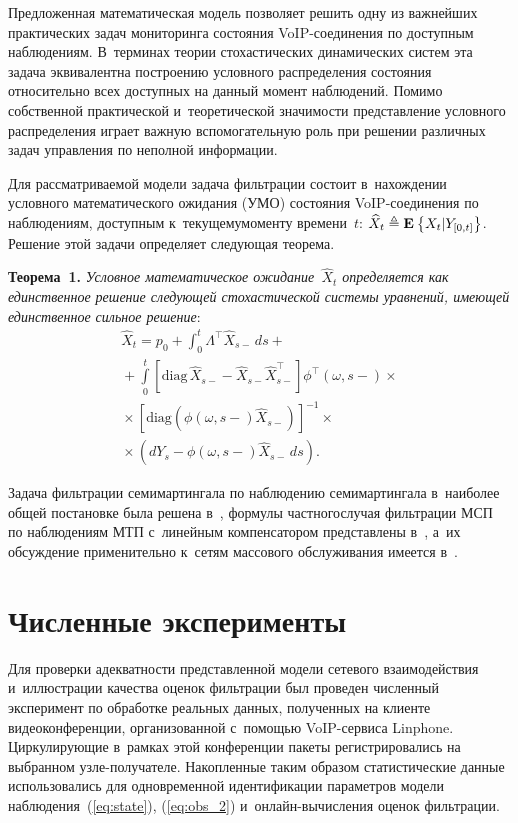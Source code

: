 \begin{multicols}{2}
Предложенная математическая модель позволяет решить одну из
важнейших практических задач мониторинга состояния VoIP-со\-еди\-не\-ния
по доступным наблюдениям. В~терминах теории стохастических
динамических систем эта задача эквивалентна построению условного
распределения состоя\-ния относительно всех доступных на данный момент
наблюдений. Помимо собственной практической и~теоретической
значимости представление условного распределения играет важную
вспомогательную роль при решении различных задач управления по
неполной информации.

Для рассматриваемой модели задача фильт\-рации состоит в~нахождении
условного ма\-те\-ма\-ти\-ческого ожидания (УМО) состояния VoIP-со\-еди\-нения
по наблюдениям, доступным к~текущему\linebreak моменту времени~$t$:
$\widehat{X}_t \triangleq \mathbf{E}_{  }\left\{ \mathop{X_t|Y_{[0,t]}} \right\}$. Решение этой задачи
определяет следующая теорема.

\smallskip

\noindent
\textbf{Теорема~1.}
\textit{Условное математическое ожидание~$\widehat{X}_t$ определяется как единственное решение следующей
стохастической системы уравнений, имеющей единственное сильное
решение}:
\begin{multline}
\widehat{X}_t = p_0 + \int_0^t \Lambda^{\top}\widehat{X}_{s-}\,ds +{}\\
{}+
\int\limits_0^t\left[ \mathrm{diag}\, \widehat{X}_{s-} - \widehat{X}_{s-}
\widehat{X}^{\top}_{s-}
 \right]\phi^{\top}(\omega,s-) \times{} \\ 
 {}\times
 \left[\mathrm{diag}\left(
 \phi(\omega,s-) \widehat{X}_{s-}
 \right) \right]^{-1}\times{}\\
 {}\times\left(
 dY_s-\phi(\omega,s-)\widehat{X}_{s-}\,ds
 \right).
\label{eq:filt_1}
\end{multline}


Задача фильтрации семимартингала по наблюдению семимартингала 
в~наиболее общей постановке была решена в~\cite{LS_89}, формулы
частного\linebreak случая фильтрации МСП по наблюдениям МТП с~линейным
компенсатором представлены в~\cite{B_14}, а~их обсуждение
применительно к~сетям массового обслуживания имеется в~\cite{B_15}.

\section{Численные эксперименты} %

Для проверки адекватности представленной модели сетевого
взаимодействия и~иллюстрации качества  оценок фильтрации был
проведен численный эксперимент по обработке реальных данных,
полученных на клиенте видеоконференции, организованной с~по\-мощью
VoIP-сер\-ви\-са Linphone. Циркулирующие в~рамках этой конференции
пакеты регистрировались на выбранном узле-получателе. Накопленные
таким образом статистические данные использовались для одновременной
идентификации параметров модели наблюдения~(\ref{eq:state}),
(\ref{eq:obs_2}) и~он\-лайн-вы\-чис\-ле\-ния оценок фильтрации.


\end{multicols}
